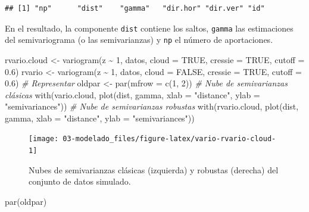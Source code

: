 \documentclass[
  spanish,
]{book}
\newenvironment{Shaded}{\begin{snugshade}}{\end{snugshade}}
\newcommand{\AttributeTok}[1]{\textcolor[rgb]{0.77,0.63,0.00}{#1}}
\newcommand{\CommentTok}[1]{\textcolor[rgb]{0.56,0.35,0.01}{\textit{#1}}}
\newcommand{\ConstantTok}[1]{\textcolor[rgb]{0.00,0.00,0.00}{#1}}
\newcommand{\DecValTok}[1]{\textcolor[rgb]{0.00,0.00,0.81}{#1}}
\newcommand{\FloatTok}[1]{\textcolor[rgb]{0.00,0.00,0.81}{#1}}
\newcommand{\FunctionTok}[1]{\textcolor[rgb]{0.00,0.00,0.00}{#1}}
\newcommand{\NormalTok}[1]{#1}
\newcommand{\OtherTok}[1]{\textcolor[rgb]{0.56,0.35,0.01}{#1}}
\newcommand{\SpecialCharTok}[1]{\textcolor[rgb]{0.00,0.00,0.00}{#1}}
\newcommand{\StringTok}[1]{\textcolor[rgb]{0.31,0.60,0.02}{#1}}
\theoremstyle{break}
\theoremstyle{definition}
\theoremstyle{definition}
\theoremstyle{definition}
\theoremstyle{definition}
\theoremstyle{remark}
\begin{document}
\begin{verbatim}
## [1] "np"      "dist"    "gamma"   "dir.hor" "dir.ver" "id"
\end{verbatim}

En el resultado, la componente \texttt{dist} contiene los saltos, \texttt{gamma} las estimaciones del semivariograma (o las semivarianzas) y \texttt{np} el número de aportaciones.

\begin{Shaded}
\begin{Highlighting}[]
\NormalTok{rvario.cloud }\OtherTok{\textless{}{-}} \FunctionTok{variogram}\NormalTok{(z }\SpecialCharTok{\textasciitilde{}} \DecValTok{1}\NormalTok{, datos, }\AttributeTok{cloud =} \ConstantTok{TRUE}\NormalTok{, }\AttributeTok{cressie =} \ConstantTok{TRUE}\NormalTok{, }\AttributeTok{cutoff =} \FloatTok{0.6}\NormalTok{)}
\NormalTok{rvario }\OtherTok{\textless{}{-}} \FunctionTok{variogram}\NormalTok{(z }\SpecialCharTok{\textasciitilde{}} \DecValTok{1}\NormalTok{, datos, }\AttributeTok{cloud =} \ConstantTok{FALSE}\NormalTok{, }\AttributeTok{cressie =} \ConstantTok{TRUE}\NormalTok{, }\AttributeTok{cutoff =} \FloatTok{0.6}\NormalTok{)}
\CommentTok{\# Representar}
\NormalTok{oldpar }\OtherTok{\textless{}{-}} \FunctionTok{par}\NormalTok{(}\AttributeTok{mfrow =} \FunctionTok{c}\NormalTok{(}\DecValTok{1}\NormalTok{, }\DecValTok{2}\NormalTok{))}
\CommentTok{\# Nube de semivarianzas clásicas}
\FunctionTok{with}\NormalTok{(vario.cloud,  }\FunctionTok{plot}\NormalTok{(dist, gamma, }\AttributeTok{xlab =} \StringTok{"distance"}\NormalTok{, }\AttributeTok{ylab =} \StringTok{"semivariances"}\NormalTok{))}
\CommentTok{\# Nube de semivarianzas robustas}
\FunctionTok{with}\NormalTok{(rvario.cloud,  }\FunctionTok{plot}\NormalTok{(dist, gamma, }\AttributeTok{xlab =} \StringTok{"distance"}\NormalTok{, }\AttributeTok{ylab =} \StringTok{"semivariances"}\NormalTok{))}
\end{Highlighting}
\end{Shaded}

\begin{figure}[!htb]

{\centering \texttt{[image: 03-modelado\_files/figure-latex/vario-rvario-cloud-1]} 

}

\caption{Nubes de semivarianzas clásicas (izquierda) y robustas (derecha) del conjunto de datos simulado.}\label{fig:vario-rvario-cloud}
\end{figure}

\begin{Shaded}
\begin{Highlighting}[]
\FunctionTok{par}\NormalTok{(oldpar)}
\end{Highlighting}
\end{Shaded}
\end{document}

